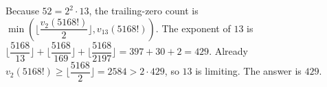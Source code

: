 Because $52=2^2\cdot13$, the trailing-zero count is $\min(\lfloor\dfrac{v_2(5168!)}{2}\rfloor,v_{13}(5168!))$. The exponent of $13$ is $\lfloor\dfrac{5168}{13}\rfloor+\lfloor\dfrac{5168}{169}\rfloor+\lfloor\dfrac{5168}{2197}\rfloor=397+30+2=429$. Already $v_2(5168!)\ge\lfloor\dfrac{5168}{2}\rfloor=2584>2\cdot429$, so $13$ is limiting. The answer is $\boxed{429}$.
